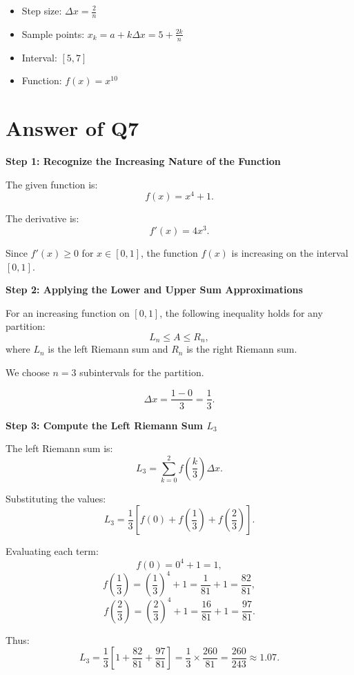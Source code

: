 \documentclass{article}
\begin{document}
\begin{itemize}
    \item Step size: \(\Delta x = \frac{2}{n}\)
    \item Sample points: \(x_k = a + k\Delta x = 5 + \frac{2k}{n}\)
    \item Interval: \([5, 7]\)
    \item Function: \(f(x) = x^{10}\)
\end{itemize}
\section*{Answer of Q7}

\noindent
\textbf{Step 1: Recognize the Increasing Nature of the Function}

The given function is:
\[
f(x) = x^4 + 1.
\]

The derivative is:
\[
f'(x) = 4x^3.
\]

Since \(f'(x) \geq 0\) for \(x \in [0,1]\), the function \(f(x)\) is increasing on the interval \([0,1]\).

\vspace{0.5cm}
\noindent
\textbf{Step 2: Applying the Lower and Upper Sum Approximations}

For an increasing function on \([0,1]\), the following inequality holds for any partition:
\[
L_n \leq A \leq R_n,
\]
where \(L_n\) is the left Riemann sum and \(R_n\) is the right Riemann sum.

We choose \(n = 3\) subintervals for the partition.

\[
\Delta x = \frac{1-0}{3} = \frac{1}{3}.
\]

\vspace{0.5cm}
\noindent
\textbf{Step 3: Compute the Left Riemann Sum \(L_3\)}

The left Riemann sum is:
\[
L_3 = \sum_{k=0}^{2} f\left(\frac{k}{3}\right) \Delta x.
\]

Substituting the values:
\[
L_3 = \frac{1}{3} \left[ f(0) + f\left(\frac{1}{3}\right) + f\left(\frac{2}{3}\right) \right].
\]

Evaluating each term:
\[
f(0) = 0^4 + 1 = 1,
\]
\[
f\left(\frac{1}{3}\right) = \left(\frac{1}{3}\right)^4 + 1 = \frac{1}{81} + 1 = \frac{82}{81},
\]
\[
f\left(\frac{2}{3}\right) = \left(\frac{2}{3}\right)^4 + 1 = \frac{16}{81} + 1 = \frac{97}{81}.
\]

Thus:
\[
L_3 = \frac{1}{3} \left[1 + \frac{82}{81} + \frac{97}{81}\right] = \frac{1}{3} \times \frac{260}{81} = \frac{260}{243} \approx 1.07.
\]
\end{document}
